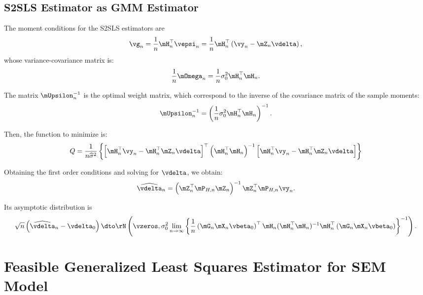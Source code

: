 \documentclass[english,12pt]{book}\usepackage[]{graphicx}\usepackage[]{xcolor}
\begin{document}
\subsection{S2SLS Estimator as GMM Estimator}

The moment conditions for the S2SLS estimators are
\begin{equation*}
\vg_n = \frac{1}{n}\mH^\top_n\vepsi_n= \frac{1}{n}\mH^\top_n\left(\vy_n - \mZ_n\vdelta\right),
\end{equation*}
%
whose variance-covariance matrix is:
\begin{equation*}
 \frac{1}{n}\mOmega_n = \frac{1}{n}\sigma_0^2\mH_n^\top\mH_n.
\end{equation*}

The matrix $\mUpsilon_n^{-1}$ is the optimal weight matrix, which correspond to the inverse of the covariance matrix of the sample moments: 
\begin{equation*}
	\mUpsilon_n^{-1} = \left(\frac{1}{n}\sigma_0^2\mH_n^\top\mH_n\right)^{-1}.
\end{equation*}

Then, the function to minimize is:
\begin{equation*}
		Q  = \frac{1}{n\widehat{\sigma}^2}\left\lbrace \left[\mH^\top_n\vy_n - \mH^\top_n\mZ_n\vdelta\right]^\top\left(\mH^\top_n\mH_n\right)^{-1}\left[\mH^\top_n\vy_n - \mH^\top_n\mZ_n\vdelta\right]\right\rbrace 
\end{equation*}

Obtaining the first order conditions and solving for $\vdelta$, we obtain:
\begin{equation}
  \widehat{\vdelta}_{n} = \left(\mZ^\top_n\mP_{H,n}\mZ_n\right)^{-1}\mZ^\top_n\mP_{H, n}\vy_n. 
\end{equation}

Its asymptotic distribution is
\begin{equation*}
  \sqrt{n}\left(\widehat{\vdelta}_{n} - \vdelta_0\right)\dto \rN\left(\vzeros, \sigma_0^2\lim_{n\to\infty}\left\lbrace \frac{1}{n}\left(\mG_n\mX_n\vbeta_0\right)^\top \mH_n(\mH_n^\top\mH_n)^{-1}\mH_n^\top\left(\mG_n\mX_n\vbeta_0\right)\right\rbrace^{-1}\right).
\end{equation*}

\section{Feasible Generalized Least Squares Estimator for SEM Model}\label{sec:sfgls-sem}
\end{document}
